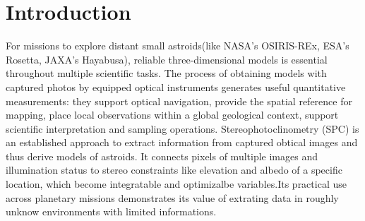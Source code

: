 \section{Introduction}
\label{sec:introduction}








% 



For missions to explore distant small astroids(like NASA's OSIRIS-REx\citep{alasad2021}, ESA's Rosetta\citep{taylor2017rosetta}, JAXA's Hayabusa\citep{fujiwara2006,demura2006}), reliable three-dimensional models is essential throughout multiple scientific tasks. The process of obtaining models with captured photos by equipped optical instruments generates useful quantitative measurements: they support optical navigation, provide the spatial reference for mapping, place local observations within a global geological context, support scientific interpretation and sampling operations. Stereophotoclinometry (SPC)\citep{barnouin2020} is an established approach to extract information from captured obtical images and thus derive models of astroids. It connects pixels of multiple images and illumination status to stereo constraints like elevation and albedo of a specific location, which become integratable and optimizalbe variables.Its practical use across planetary missions demonstrates its value of extrating data in roughly unknow environments with limited informations.

